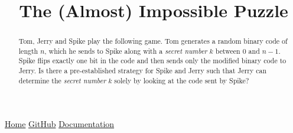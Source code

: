 \documentclass[11pt,a4paper]{amsart}
\title{The (Almost) Impossible Puzzle}
\begin{document}
\maketitle
\begin{center}
\href{https://mihaiancu.github.io/Puzzle}{Home}
\href{https://github.com/mihaiancu/Puzzle}{GitHub}
\href{https://mihaiancu.github.io/Puzzle/docs/Puzzle/Solution.html}{Documentation}
\end{center}

\begin{abstract}
Tom, Jerry and Spike play the following game.
Tom generates a random binary code of length $n$,
which he sends to Spike along with a \textit{secret number} $k$
between 0 and $n-1$. Spike flips exactly one bit in the code
and then sends only the modified binary code to Jerry.
Is there a pre-established strategy for Spike and Jerry
such that Jerry can determine the \textit{secret number} $k$
solely by looking at the code sent by Spike?
\end{abstract}


















\end{document}
